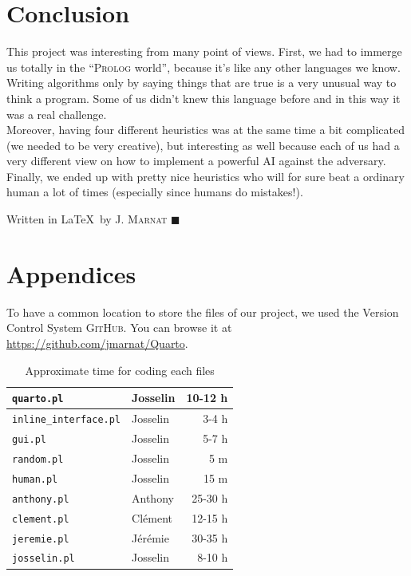 \documentclass[a4paper,11pt]{article}
\newcommand{\tw}[1]{\texttt{#1}}
\newcommand{\mytable}[3]{
	\begin{table}[ht]
		\begin{center}
			\begin{tabular}{#2}
				#3
			\end{tabular}
		\caption{#1}
		\end{center}
	\end{table}
}
\begin{document}
	\section{Conclusion}
		This project was interesting from many point of views. First, we had to immerge us totally in the ``\textsc{Prolog} world'', because it's like any other languages we know. Writing algorithms only by saying things that are true is a very unusual way to think a program. Some of us didn't knew this language before and in this way it was a real challenge. \\
		Moreover, having four different heuristics was at the same time a bit complicated (we needed to be very creative), but interesting as well because each of us had a very different view on how to implement a powerful AI against the adversary. \\
		Finally, we ended up with pretty nice heuristics who will for sure beat a ordinary human a lot of times (especially since humans do mistakes!).

		\vfill
		\begin{flushright}
			\footnotesize{Written in \LaTeX\ by J. \textsc{Marnat} $\blacksquare$}
		\end{flushright}

	\newpage
	\section{Appendices}
		To have a common location to store the files of our project, we used the Version Control System \textsc{GitHub}. You can browse it at \href{https://github.com/jmarnat/Quarto}{https://github.com/jmarnat/Quarto}.\\[2cm]
		

		\mytable{Approximate time for coding each files}{|l||l|r|}{\hline
			\tw{quarto.pl}				& Josselin		& 10-12 h	\\\hline
			\tw{inline\_interface.pl}	& Josselin		& 3-4 h		\\\hline
			\tw{gui.pl}					& Josselin		& 5-7 h		\\\hline
			\tw{random.pl}				& Josselin		& 5 m		\\\hline
			\tw{human.pl}				& Josselin		& 15 m		\\\hline
			\tw{anthony.pl}				& Anthony		& 25-30 h	\\\hline
			\tw{clement.pl}				& Clément		& 12-15 h	\\\hline
			\tw{jeremie.pl}				& Jérémie		& 30-35 h	\\\hline
			\tw{josselin.pl}			& Josselin		& 8-10 h	\\\hline
		}
\end{document}
